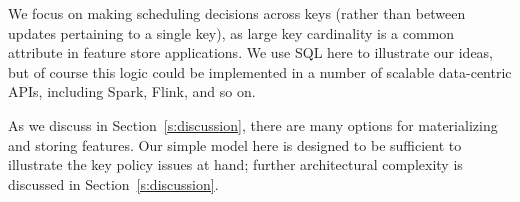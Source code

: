  We focus on making scheduling decisions across keys (rather than between updates pertaining to a single key), as large key cardinality is a common attribute in feature store applications. We use SQL here to illustrate our ideas, but of course this logic could be implemented in a number of scalable data-centric APIs, including Spark, Flink, and so on.

As we discuss in Section~\ref{s:discussion}, there are many options for materializing and storing features. Our simple model here is designed to be sufficient to illustrate the key policy issues at hand; further architectural complexity is discussed in Section~\ref{s:discussion}.